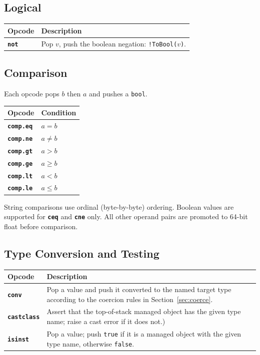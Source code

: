 \documentclass[11pt,a4paper]{article}
\newcommand{\opcode}[1]{\textbf{\texttt{#1}}}
\begin{document}
\subsection{Logical}

\begin{longtable}{lp{10.5cm}}
  \toprule
  \textbf{Opcode} & \textbf{Description} \\
  \midrule
  \endhead
  \opcode{not} & Pop $v$, push the boolean negation: \texttt{!ToBool($v$)}. \\
  \bottomrule
\end{longtable}

\subsection{Comparison}

Each opcode pops $b$ then $a$ and pushes a \texttt{bool}.

\begin{longtable}{ll}
  \toprule
  \textbf{Opcode} & \textbf{Condition} \\
  \midrule
  \endhead
  \opcode{comp.eq} & $a = b$ \\
  \opcode{comp.ne} & $a \neq b$ \\
  \opcode{comp.gt} & $a > b$ \\
  \opcode{comp.ge} & $a \geq b$ \\
  \opcode{comp.lt} & $a < b$ \\
  \opcode{comp.le} & $a \leq b$ \\
  \bottomrule
\end{longtable}

String comparisons use ordinal (byte-by-byte) ordering.
Boolean values are supported for \opcode{ceq} and \opcode{cne} only.
All other operand pairs are promoted to 64-bit float before comparison.

\subsection{Type Conversion and Testing}

\begin{longtable}{lp{10.5cm}}
  \toprule
  \textbf{Opcode}    & \textbf{Description} \\
  \midrule
  \endhead
  \opcode{conv}      &
    Pop a value and push it converted to the named target type according
    to the coercion rules in Section~\ref{sec:coerce}. \\
  \opcode{castclass} &
    Assert that the top-of-stack managed object has the given type name;
    raise a cast error if it does not.) \\
  \opcode{isinst}    &
    Pop a value; push \texttt{true} if it is a managed object with the
    given type name, otherwise \texttt{false}. \\
  \bottomrule
\end{longtable}
\end{document}
